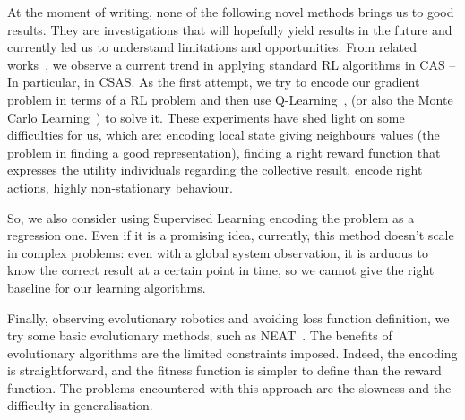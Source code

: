 \documentclass[conference]{IEEEtran}
\begin{document}
At the moment of writing, none of the following novel methods brings us to good results. They are investigations that will hopefully yield results in the future and currently led us to understand limitations and opportunities.
%
From related works~\cite{DAngelo2019}, we observe a current trend in applying standard RL algorithms in CAS -- In particular, in CSAS.
%
%
As the first attempt, we try to encode our gradient problem in terms of a RL problem and then use Q-Learning~\cite{DBLP:journals/ras/Krose95}, (or also the Monte Carlo Learning~\cite{DBLP:conf/nips/Thrun99}) to solve it.
%
These experiments have shed light on some difficulties for us, which are: encoding local state giving neighbours values (the problem in finding a good representation), finding a right reward function that expresses the utility individuals
regarding the collective result, encode right actions, highly non-stationary behaviour. 
%

So, we also consider using Supervised Learning encoding the problem as a regression one.
% 
Even if it is a promising idea, currently, this method doesn't scale in complex problems: even with a global system observation, it is arduous to know the correct result at a certain point in time, so 
we cannot give the right baseline for our learning algorithms.

Finally, observing evolutionary robotics and avoiding loss function definition, we try some basic evolutionary methods, such as NEAT~\cite{DBLP:journals/ec/StanleyM02}.
%
The benefits of evolutionary algorithms are the limited constraints imposed. Indeed, the encoding is straightforward, and the fitness function is simpler to define than the reward function.
%
The problems encountered with this approach are the slowness and the difficulty in generalisation.
%
\end{document}
